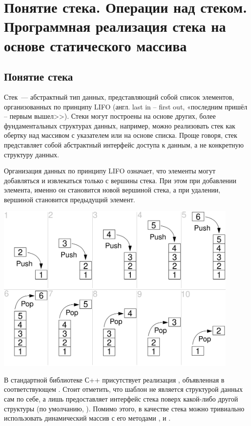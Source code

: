 \section{Понятие стека. Операции над стеком. Программная реализация стека на основе статического массива}
\subsection{Понятие стека}
Стек~--- абстрактный тип данных, представляющий собой список элементов, организованных по принципу
LIFO (англ. last in -- first out, «последним пришёл -- первым вышел>>). Стеки могут построены на основе других, более фундаментальных
структурах данных, например, можно реализовать стек как обертку над массивом с указателем или на основе списка. Проще говоря, стек представляет
собой абстрактный интерфейс доступа к данным, а не конкретную структуру данных.

Организация данных по принципу LIFO означает, что элементы могут добавляться и извлекаться только с вершины стека. При этом при добавлении
элемента, именно он становится новой вершиной стека, а при удалении, вершиной становится предыдущий элемент.

\includegraphics[width=0.9\textwidth]{resources/19-26/stack.png}

В стандартной библиотеке С++ присутствует реализация , объявленная в соответствующем
. Стоит отметить, что шаблон  не является
структурой данных сам по себе, а лишь предоставляет интерфейс стека поверх какой-либо другой структуры (по умолчанию, ).
Помимо этого, в качестве стека можно тривиально использовать динамический массив  с его
методами ,  и .
